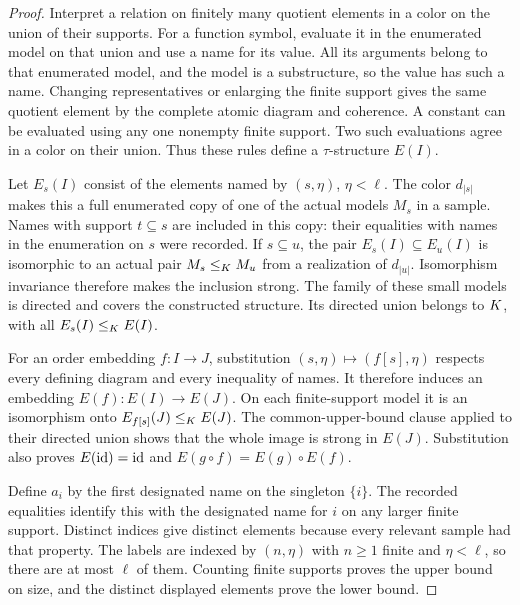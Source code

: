 \begin{proof}
Interpret a relation on finitely many quotient elements in a
color on the union of their supports. For a function symbol,
evaluate it in the enumerated model on that union and use a name
for its value. All its arguments belong to that enumerated model,
and the model is a substructure, so the value has such a name.
Changing representatives or enlarging the finite support gives
the same quotient element by the complete atomic diagram and
coherence. A constant can be evaluated using any one nonempty
finite support. Two such evaluations agree in a color on their
union. Thus these rules define a $\tau$-structure $E(I)$.

Let $E_s(I)$ consist of the elements named by $(s,\eta)$,
$\eta<\ell$. The color $d_{|s|}$ makes this a full enumerated copy
of one of the actual models $M_s$ in a sample. Names with support
$t\subseteq s$ are included in this copy: their equalities with
names in the enumeration on $s$ were recorded. If $s\subseteq u$,
the pair $E_s(I)\subseteq E_u(I)$ is isomorphic to an actual pair
$M_s\leq_K M_u$ from a realization of $d_{|u|}$. Isomorphism
invariance therefore makes the inclusion strong. The family of
these small models is directed and covers the constructed
structure. Its directed union belongs to $K$, with all
$E_s(I)\leq_K E(I)$.

For an order embedding $f:I\longrightarrow J$, substitution
$(s,\eta)\mapsto(f[s],\eta)$ respects every defining diagram and
every inequality of names. It therefore induces an embedding
$E(f):E(I)\longrightarrow E(J)$. On each finite-support model it
is an isomorphism onto $E_{f[s]}(J)\leq_K E(J)$. The
common-upper-bound clause applied to their directed union shows
that the whole image is strong in $E(J)$. Substitution also
proves $E(\operatorname{id})=\operatorname{id}$ and $E(g\circ f)=E(g)\circ E(f)$.

Define $a_i$ by the first designated name on the singleton $\{i\}$.
The recorded equalities identify this with the designated name
for $i$ on any larger finite support. Distinct indices give
distinct elements because every relevant sample had that
property. The labels are indexed by $(n,\eta)$ with $n\geq1$
finite and $\eta<\ell$, so there are at most $\ell$ of them.
Counting finite supports proves the upper bound on size, and the
distinct displayed elements prove the lower bound.
\end{proof}
